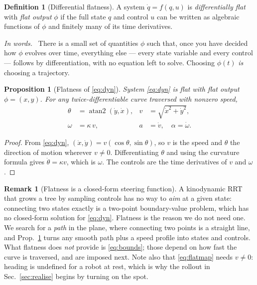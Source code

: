\documentclass[conference]{IEEEtran}
\theoremstyle{plain}
\newtheorem{proposition}{Proposition}
\theoremstyle{definition}
\newtheorem{definition}{Definition}
\newtheorem{remark}{Remark}
\newcommand{\inwords}{\par\smallskip\noindent\textit{In words.}\ }
\begin{document}
\begin{definition}[Differential flatness]
A system $\dot q = f(q,u)$ is \emph{differentially flat} with \emph{flat output} $\phi$ if
the full state $q$ and control $u$ can be written as algebraic functions of $\phi$ and
finitely many of its time derivatives.
\inwords
There is a small set of quantities $\phi$ such that, once you have decided how $\phi$
evolves over time, everything else --- every state variable and every control --- follows by
differentiation, with no equation left to solve. Choosing $\phi(t)$ \emph{is} choosing a
trajectory.
\end{definition}

\begin{proposition}[Flatness of \eqref{eq:dyn}]
\label{prop:flat}
System \eqref{eq:dyn} is flat with flat output $\phi = (x,y)$. For any twice-differentiable
curve traversed with nonzero speed,
\begin{equation}
\begin{aligned}
  \theta &= \operatorname{atan2}(\dot y, \dot x), & v &= \sqrt{\dot x^2 + \dot y^2},\\
  \omega &= \kappa\, v, & a &= \dot v, \quad \alpha = \dot\omega .
\end{aligned}
  \label{eq:flatmap}
\end{equation}
\end{proposition}

\begin{proof}
From \eqref{eq:dyn}, $(\dot x,\dot y) = v(\cos\theta,\sin\theta)$, so $v$ is the speed and
$\theta$ the direction of motion wherever $v \ne 0$. Differentiating $\theta$ and using the
curvature formula gives $\dot\theta = \kappa v$, which is $\omega$. The controls are the
time derivatives of $v$ and $\omega$.
\end{proof}

\begin{remark}[Flatness is a closed-form steering function]
\label{rem:steer}
A kinodynamic RRT that grows a tree by sampling controls \cite{lavalle2001} has no way to
\emph{aim} at a given state: connecting two states exactly is a two-point boundary-value
problem, which has no closed-form solution for \eqref{eq:dyn}. Flatness is the reason we do
not need one. We search for a \emph{path} in the plane, where connecting two points is a
straight line, and Prop.~\ref{prop:flat} turns any smooth path plus a speed profile into
states and controls. What flatness does \emph{not} provide is \eqref{eq:bounds}; those depend
on how fast the curve is traversed, and are imposed next. Note also that \eqref{eq:flatmap}
needs $v \ne 0$: heading is undefined for a robot at rest, which is why the rollout in
Sec.~\ref{sec:realise} begins by turning on the spot.
\end{remark}
\end{document}
